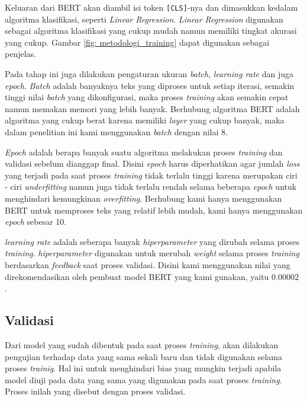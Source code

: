 Keluaran dari BERT akan diambil isi token \texttt{[CLS]}-nya dan dimasukkan kedalam algoritma klasifikasi, seperti \textit{Linear Regression}. \textit{Linear Regression} digunakan sebagai algoritma klasifikasi yang cukup mudah namun memiliki tingkat akurasi yang cukup. Gambar \ref{fig: metodologi_training} dapat digunakan sebagai penjelas.

Pada tahap ini juga dilakukan pengaturan ukuran \textit{batch}, \textit{learning rate} dan juga \textit{epoch}. \textit{Batch} adalah banyaknya teks yang diproses untuk setiap iterasi, semakin tinggi nilai \textit{batch} yang dikonfigurasi, maka proses \textit{training} akan semakin cepat namun memakan memori yang lebih banyak. Berhubung algoritma BERT adalah algoritma yang cukup berat karena memiliki \textit{layer} yang cukup banyak, maka dalam penelitian ini kami menggunakan \textit{batch} dengan nilai 8.

\textit{Epoch} adalah berapa banyak suatu algoritma melakukan proses \textit{training} dan validasi sebelum dianggap final. Disini \textit{epoch} harus diperhatikan agar jumlah \textit{loss} yang terjadi pada saat proses \textit{training} tidak terlalu tinggi karena merupakan ciri - ciri \textit{underfitting} namun juga tidak terlalu rendah selama beberapa \textit{epoch} untuk menghindari kemungkinan \textit{overfitting}. Berhubung kami hanya menggunakan BERT untuk memproses teks yang relatif lebih mudah, kami hanya menggunakan \textit{epoch} sebesar 10.

\textit{learning rate} adalah seberapa banyak \textit{hiperparameter} yang dirubah selama proses \textit{training}. \textit{hiperparameter} digunakan untuk merubah \textit{weight} selama proses \textit{training} berdasarkan \textit{feedback} saat proses validasi. Disini kami menggunakan nilai yang direkomendasikan oleh pembuat model BERT yang kami gunakan, yaitu 0.00002 \cite{koto2020indolem}.

\subsection{Validasi}

Dari model yang sudah dibentuk pada saat proses \textit{training}, akan dilakukan pengujian terhadap data yang sama sekali baru dan tidak digunakan selama proses \textit{trainig}. Hal ini untuk menghindari bias yang mungkin terjadi apabila model diuji pada data yang sama yang digunakan pada saat proses \textit{training}. Proses inilah yang disebut dengan proses validasi.

